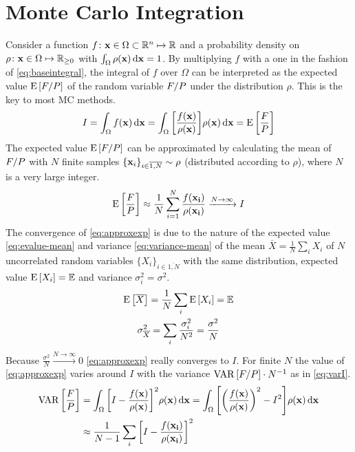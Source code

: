 \section{Monte Carlo Integration}%
\label{sec:mcint}

Consider a function
\(f\colon \vb{x}\in\Omega\subset\mathbb{R}^n\mapsto\mathbb{R}\) and a
probability density on
\(\rho\colon \vb{x}\in\Omega\mapsto\mathbb{R}_{\geq 0}\) with
\(\int_{\Omega}\rho(\vb{x})\dd{\vb{x}} = 1\).  By multiplying \(f\)
with a one in the fashion of \cref{eq:baseintegral}, the integral of
\(f\) over \(\Omega\) can be interpreted as the expected value
\(\operatorname{E}\qty[F/P]\) of the random variable \(F/P\) under the
distribution \(\rho\). This is the key to most MC methods.
%
\begin{equation}
  \label{eq:baseintegral}
  I = \int_\Omega f(\vb{x}) \dd{\vb{x}} = \int_\Omega
  \qty[\frac{f(\vb{x})}{\rho(\vb{x})}] \rho(\vb{x}) \dd{\vb{x}} = \operatorname{E}\qty[\frac{F}{P}]
\end{equation}
%
The expected value \(\operatorname{E}\qty[F/P]\) can be approximated by calculating
the mean of \(F/P\) with \(N\) finite samples
\(\{\vb{x}_i\}_{i\in\overline{1,N}}\sim\rho\) (distributed according
to \(\rho\)), where \(N\) is a very large integer.
%
\begin{equation}
  \label{eq:approxexp}
  \operatorname{E}\qty[\frac{F}{P}] \approx
  \frac{1}{N}\sum_{i=1}^N\frac{f(\vb{x_i})}{\rho(\vb{x_i})}
  \xrightarrow{N\rightarrow\infty} I
\end{equation}
%
The convergence of \cref{eq:approxexp} is due to the nature of the
expected value \cref{eq:evalue-mean} and
variance \cref{eq:variance-mean} of the mean
\(\overline{X} = \frac{1}{N}\sum_i X_i\) of \(N\) uncorrelated random
variables \(\{X_i\}_{i\in\overline{1,N}}\) with the same distribution,
expected value \(\operatorname{E}\qty[X_i]=\mathbb{E}\) and variance
\(\sigma_i^2 = \sigma^2\).
%
\begin{gather}
  \operatorname{E}\qty[\overline{X}] = \frac{1}{N}\sum_i\operatorname{E}\qty[X_i] = \mathbb{E} \label{eq:evalue-mean}\\
  \sigma^2_{\overline{X}} = \sum_i\frac{\sigma_i^2}{N^2} =
                            \frac{\sigma^2}{N}  \label{eq:variance-mean}
\end{gather}
%
Because \(\frac{\sigma^2}{N}\xrightarrow{N\rightarrow\infty} 0\)
\cref{eq:approxexp} really converges to \(I\). For finite \(N\) the
value of \cref{eq:approxexp} varies around \(I\) with the variance
\(\operatorname{VAR}\qty[F/P]\cdot N^{-1}\) as in \cref{eq:varI}.
%
\begin{align}
  \operatorname{VAR}\qty[\frac{F}{P}] &= \int_\Omega \qty[I -
  \frac{f(\vb{x})}{\rho(\vb{x})}]^2 \rho({\vb{x}}) \dd{\vb{x}} =
  \int_\Omega \qty[\qty(\frac{f(\vb{x})}{\rho(\vb{x})})^2 -
  I^2]\rho({\vb{x}}) \dd{\vb{x}}   \label{eq:varI}
 \\
  &\approx \frac{1}{N - 1}\sum_i \qty[I -
  \frac{f(\vb{x_i})}{\rho(\vb{x_i})}]^2  \label{eq:varI-approx}
\end{align}
